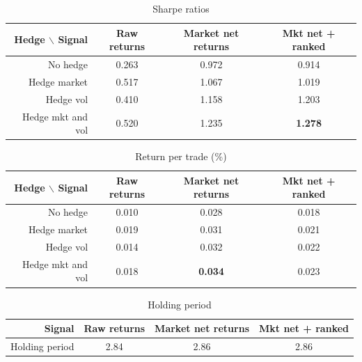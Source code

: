 \documentclass[letterpaper, 10 pt, conference]{ieeeconf}  %
\begin{document}
\begin{appendices}
\begin{table}[H]
\caption{Sharpe ratios}
\label{Sharpe}
\centering
\begin{tabular}{|r|c|c|c|}\hline
Hedge $\backslash$ Signal & Raw returns & Market net returns & Mkt net + ranked \\ \hline
No hedge & 0.263 & 0.972 & 0.914 \\
Hedge market & 0.517 & 1.067 & 1.019 \\
Hedge vol & 0.410 & 1.158 & 1.203 \\
Hedge mkt and vol & 0.520 & 1.235 & \textbf{1.278} \\ \hline
\end{tabular}
\end{table}

\begin{table}[H]
\centering
\caption{Return per trade (\%)}
\begin{tabular}{|r|c|c|c|}\hline
Hedge $\backslash$ Signal & Raw returns & Market net returns & Mkt net + ranked \\ \hline
No hedge & 0.010 & 0.028 & 0.018 \\
Hedge market & 0.019 & 0.031 & 0.021 \\
Hedge vol & 0.014 & 0.032 & 0.022 \\
Hedge mkt and vol & 0.018 & \textbf{0.034} & 0.023 \\ \hline
\end{tabular}
\end{table}

\begin{table}[H]
\centering
\caption{Holding period}
\label{Holding}
\begin{tabular}{|r|c|c|c|}\hline
Signal & Raw returns & Market net returns & Mkt net + ranked \\ \hline
Holding period & 2.84 & 2.86 & 2.86 \\ \hline
\end{tabular}
\end{table}

\end{appendices}
\end{document}
